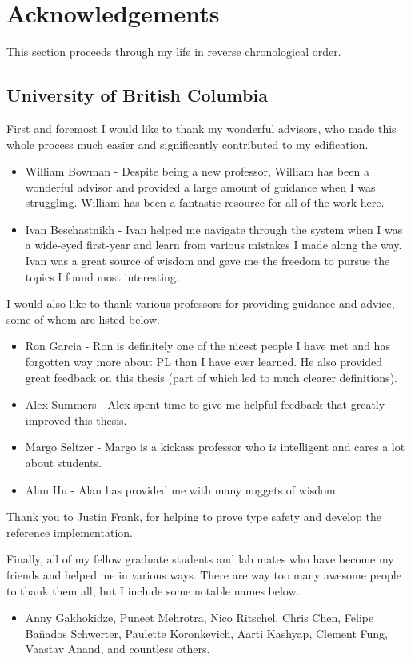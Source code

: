 \chapter{Acknowledgements}
This section proceeds through my life in reverse chronological order.

\section*{University of British Columbia}
First and foremost I would like to thank my wonderful advisors, who made this whole process much easier and significantly contributed to my edification.
\begin{itemize}
    \item William Bowman - Despite being a new professor, William has been a wonderful advisor and provided a large amount of guidance when I was struggling.
    William has been a fantastic resource for all of the work here.
    \item Ivan Beschastnikh - Ivan helped me navigate through the system when I was a wide-eyed first-year and learn from various mistakes I made along the way.
    Ivan was a great source of wisdom and gave me the freedom to pursue the topics I found most interesting.
\end{itemize}

I would also like to thank various professors for providing guidance and advice, some of whom are listed below.
\begin{itemize}
    \item Ron Garcia - Ron is definitely one of the nicest people I have met and has forgotten way more about PL than I have ever learned. He also provided great feedback on this thesis (part of which led to much clearer definitions).
    \item Alex Summers - Alex spent time to give me helpful feedback that greatly improved this thesis.
    \item Margo Seltzer - Margo is a kickass professor who is intelligent and cares a lot about students.
    \item Alan Hu - Alan has provided me with many nuggets of wisdom.
\end{itemize}

Thank you to Justin Frank, for helping to prove type safety and develop the reference implementation.

Finally, all of my fellow graduate students and lab mates who have become my friends and helped me in various ways. There are way too many awesome people to thank them all, but I include some notable names below.
\begin{itemize}
    \item Anny Gakhokidze, Puneet Mehrotra, Nico Ritschel, Chris Chen, Felipe Ba\~{n}ados Schwerter, Paulette Koronkevich, Aarti Kashyap, Clement Fung, Vaastav Anand, and countless others.
\end{itemize}

